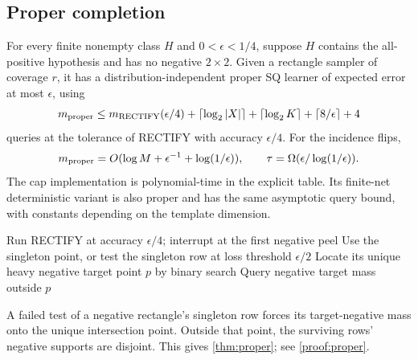 \subsection{Proper completion}\label{sec:proper}
\begin{theorem}\label{thm:proper}
For every finite nonempty class $H$ and $0<\epsilon<1/4$, suppose $H$ contains the all-positive hypothesis and has no negative $2\times2$. Given a rectangle sampler of coverage $r$, it has a distribution-independent proper SQ learner of expected error at most $\epsilon$, using
\begin{equation}\label{eq:propercomplexity}
 m_{\rm proper}\le m_{\rm RECTIFY}(\epsilon/4)
 +\lceil\log_2|X|\rceil+\lceil\log_2K\rceil
 +\lceil8/\epsilon\rceil+4
\end{equation}
queries at the tolerance of RECTIFY with accuracy $\epsilon/4$. For the incidence flips,
\[
 m_{\rm proper}=O(\log M+\epsilon^{-1}+\log(1/\epsilon)),\qquad
 \tau=\Omega(\epsilon/\log(1/\epsilon)).
\]
The cap implementation is polynomial-time in the explicit table. Its finite-net deterministic variant is also proper and has the same asymptotic query bound, with constants depending on the template dimension.
\end{theorem}

\begin{algorithm}[t]
\caption{Proper RECTIFY}\label{alg:proper}
Run RECTIFY at accuracy $\epsilon/4$; interrupt at the first negative peel\;
Use the singleton point, or test the singleton row at loss threshold $\epsilon/2$\;
Locate its unique heavy negative target point $p$ by binary search\;
Query negative target mass outside $p$\;
\end{algorithm}
A failed test of a negative rectangle's singleton row forces its target-negative mass onto the unique intersection point. Outside that point, the surviving rows' negative supports are disjoint. This gives \cref{thm:proper}; see \cref{proof:proper}.
